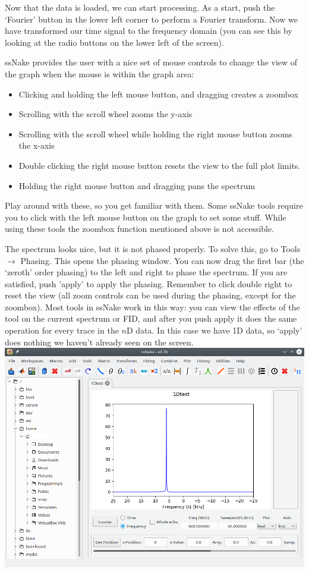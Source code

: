 \documentclass[11pt,a4paper]{article}
\begin{document}
Now that the data is loaded, we can start processing. As a start, push the `Fourier' button in the
lower left corner to perform a Fourier transform. Now we have transformed our time signal to the
frequency domain (you can see this by looking at the radio buttons on the lower left of the screen).
\begin{tcolorbox}[breakable,colback=green!5,colframe=MyBlueD,title=\large Mouse button
  controls,boxrule=2mm,colback=MyBlueD!30!white]
ssNake provides the user with a nice set of mouse controls to change the view of the graph when the mouse is within the graph area:
\begin{itemize}
\item Clicking and holding the left mouse button, and dragging creates a zoombox
\item Scrolling with the scroll wheel zooms the y-axis
\item Scrolling with the scroll wheel while holding the right mouse button zooms the x-axis
\item Double clicking the right mouse button resets the view to the full plot limits.
\item Holding the right mouse button and dragging pans the spectrum
\end{itemize}
Play around with these, so you get familiar with them. Some ssNake tools require you to click with the left mouse button on the graph to set some stuff. While using these tools the zoombox function mentioned above is not accessible.
\end{tcolorbox}

The spectrum looks nice, but it is not phased properly. To solve this, go to Tools $\rightarrow$
Phasing. This opens the phasing window. You can now drag the first bar (the `zeroth' order phasing)
to the left and right to phase the spectrum. If you are satisfied, push 'apply' to apply the
phasing. Remember to click double right to reset the view (all zoom controls can be used during the
phasing, except for the zoombox). Most tools in ssNake work in this way: you can view the effects of
the tool on the current spectrum or FID, and after you push apply it does the same operation for
every trace in the $n$D data. In this case we have 1D data, so `apply' does nothing we haven't
already seen on the screen. \\ \includegraphics[width=\linewidth]{Images/1DspecPhased.png}
\end{document}
